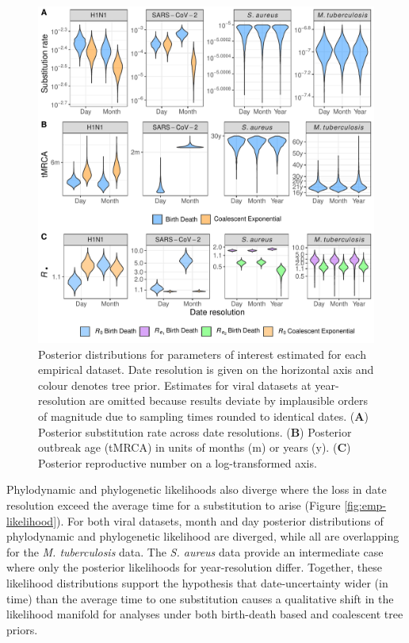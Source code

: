 \documentclass[12pt]{article}
\begin{document}
\begin{spacing}{2}
\begin{figure}[H]
    \centering
    \includegraphics[width=\textwidth]{empirical_parms.pdf}
    \caption{Posterior distributions for parameters of interest estimated for each empirical dataset. Date resolution is given on the horizontal axis and colour denotes tree prior. Estimates for viral datasets at year-resolution are omitted because results deviate by implausible orders of magnitude due to sampling times rounded to identical dates. (\textbf{A}) Posterior substitution rate across date resolutions. (\textbf{B}) Posterior outbreak age (tMRCA) in units of months (m) or years (y).  (\textbf{C}) Posterior reproductive number on a log-transformed axis.}
    \label{fig:emp-parm}
\end{figure}

Phylodynamic and phylogenetic likelihoods also diverge where the loss in date resolution exceed the average time for a substitution to arise (Figure \ref{fig:emp-likelihood}). For both viral datasets, month and day posterior distributions of phylodynamic and phylogenetic likelihood are diverged, while all are overlapping for the \textit{M. tuberculosis} data. The \textit{S. aureus} data provide an intermediate case where only the posterior likelihoods for year-resolution differ. Together, these likelihood distributions support the hypothesis that date-uncertainty wider (in time) than the average time to one substitution causes a qualitative shift in the likelihood manifold for analyses under both birth-death based and coalescent tree priors.


\end{spacing}
\end{document}
